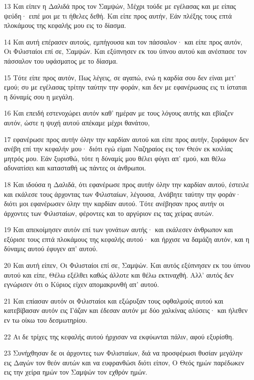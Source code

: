 \par 13 Και είπεν η Δαλιδά προς τον Σαμψών, Μέχρι τούδε με εγέλασας και με είπας ψεύδη· ειπέ μοι με τι ήθελες δεθή. Και είπε προς αυτήν, Εάν πλέξης τους επτά πλοκάμους της κεφαλής μου εις το δίασμα.
\par 14 Και αυτή επέρασεν αυτούς, εμπήγουσα και τον πάσσαλον· και είπε προς αυτόν, Οι Φιλισταίοι επί σε, Σαμψών. Και εξύπνησεν εκ του ύπνου αυτού και ανέσπασε τον πάσσαλον του υφάσματος με το δίασμα.
\par 15 Τότε είπε προς αυτόν, Πως λέγεις, σε αγαπώ, ενώ η καρδία σου δεν είναι μετ' εμού; συ με εγέλασας τρίτην ταύτην την φοράν, και δεν με εφανέρωσας εις τι ίσταται η δύναμίς σου η μεγάλη.
\par 16 Και επειδή εστενοχώρει αυτόν καθ' ημέραν με τους λόγους αυτής και εβίαζεν αυτόν, ώστε η ψυχή αυτού απέκαμε μέχρι θανάτου,
\par 17 εφανέρωσε προς αυτήν όλην την καρδίαν αυτού και είπε προς αυτήν, ξυράφιον δεν ανέβη επί την κεφαλήν μου· διότι εγώ είμαι Ναζηραίος εις τον Θεόν εκ κοιλίας μητρός μου. Εάν ξυρισθώ, τότε η δύναμίς μου θέλει φύγει απ' εμού, και θέλω αδυνατίσει και κατασταθή ως πάντες οι άνθρωποι.
\par 18 Και ιδούσα η Δαλιδά, ότι εφανέρωσε προς αυτήν όλην την καρδίαν αυτού, έστειλε και εκάλεσε τους άρχοντας των Φιλισταίων, λέγουσα, Ανάβητε ταύτην την φοράν· διότι μοι εφανέρωσεν όλην την καρδίαν αυτού. Τότε ανέβησαν προς αυτήν οι άρχοντες των Φιλισταίων, φέροντες και το αργύριον εις τας χείρας αυτών.
\par 19 Και απεκοίμησεν αυτόν επί των γονάτων αυτής· και εκάλεσεν άνθρωπον και εξύρισε τους επτά πλοκάμους της κεφαλής αυτού· και ήρχισε να δαμάζη αυτόν, και η δύναμις αυτού έφυγεν απ' αυτού.
\par 20 Και αυτή είπεν, Οι Φιλισταίοι επί σε, Σαμψών. Και αυτός εξύπνησεν εκ του ύπνου αυτού και είπε, Θέλω εξέλθει καθώς άλλοτε και θέλω εκτιναχθή. Αλλ' αυτός δεν εγνώρισεν ότι ο Κύριος είχεν απομακρυνθή απ' αυτού.
\par 21 Και επίασαν αυτόν οι Φιλισταίοι και εξώρυξαν τους οφθαλμούς αυτού και κατεβίβασαν αυτόν εις Γάζαν και έδεσαν αυτόν με δύο χαλκίνας αλύσεις· και ήλεθεν εν τω οίκω του δεσμωτηρίου.
\par 22 Αι δε τρίχες της κεφαλής αυτού ήρχισαν να εκφύωνται πάλιν, αφού εξυρίσθη.
\par 23 Συνήχθησαν δε οι άρχοντες των Φιλισταίων, διά να προσφέρωσι θυσίαν μεγάλην εις Δαγών τον θεόν αυτών και να ευφρανθώσι διότι είπον, Ο Θεός ημών παρέδωκεν εις την χείρα ημών τον Σαμψών τον εχθρόν ημών.
